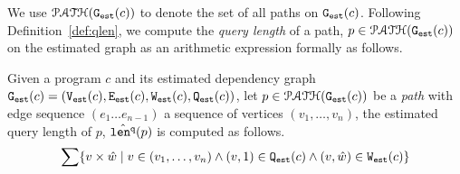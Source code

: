 We use $\mathcal{PATH}(\mathtt{{G_{est}}}(c))$ to denote the set of all paths on
 $\mathtt{{G_{est}}}({c})$.
Following Definition~\ref{def:qlen}, 
we compute
the \emph{query length} of a path, $p \in \mathcal{PATH}(\mathtt{{G_{est}}}(c))$ on the estimated graph as an arithmetic expression formally as follows.
\begin{defn}
 \label{def:qlen-static}
 Given 
 a program $c$ and its estimated dependency graph 
 $\mathtt{{G_{est}}}({c}) = (\mathtt{{V_{est}}}(c), \mathtt{{E_{est}}}(c), \mathtt{{W_{est}}}(c), \mathtt{{Q_{est}}}(c))$, 
 let $p \in \mathcal{PATH}(\mathtt{{G_{est}}}(c))$ be a \emph{path} with edge sequence $(e_1 \ldots e_{n - 1})$ 
 a sequence of vertices 
 $(v_1, \ldots, v_{n})$,
 the estimated query length of $p$, $\hat{\mathtt{len}^{\tt q}}(p)$ is computed as follows.
 \[
    \sum\left\{ v \times \hat{w}
    \mid v \in (v_1, \ldots, v_{n}) \land (v, 1) \in \progF(c)
    \land 
    (v, \hat{w}) \in \progW(c) 
    \right\}
 \]
 \end{defn}
